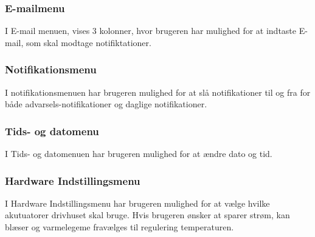 \subsubsection{E-mailmenu}
I E-mail menuen, vises 3 kolonner, hvor brugeren har mulighed for at indtaste E-mail, som skal modtage notifiktationer. 
\subsubsection{Notifikationsmenu} 
I notifikationsmenuen har brugeren mulighed for at slå notifikationer til og fra for både advarsels-notifikationer og daglige notifikationer. 
\subsubsection{Tids- og datomenu} 
I Tids- og datomenuen har brugeren mulighed for at ændre dato og tid. 
\subsubsection{Hardware Indstillingsmenu} 
I Hardware Indstillingsmenu har brugeren mulighed for at vælge hvilke akutuatorer drivhuset skal bruge. Hvis brugeren ønsker at sparer strøm, kan blæser og varmelegeme fravælges til regulering temperaturen. \\
